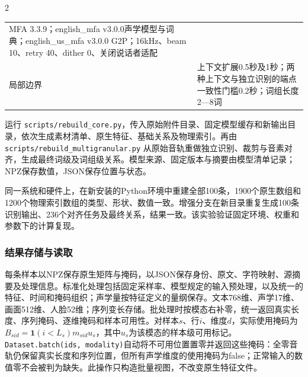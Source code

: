 \begin{PaperTable}{2}
\begin{table}[!htbp]
\begin{tabular}{@{}ll@{}}
\begin{minipage}[t]{\dimexpr 0.850000\linewidth-1.700000\tabcolsep\relax}
MFA 3.3.9；english\_mfa v3.0.0声学模型与词典；english\_us\_mfa v3.0.0 G2P；16kHz、beam 10、retry 40、dither 0、关闭说话者适配\strut
\end{minipage}\tabularnewline
\begin{minipage}[t]{\dimexpr 0.150000\linewidth-0.300000\tabcolsep\relax}\raggedright
局部边界\strut
\end{minipage} & \begin{minipage}[t]{\dimexpr 0.850000\linewidth-1.700000\tabcolsep\relax}\raggedright
上下文扩展0.5秒及1秒；两种上下文与独立识别的端点一致性门槛0.2秒；词组长度2---8词\strut
\end{minipage}\tabularnewline
\bottomrule
\end{tabular}
\end{table}

\end{PaperTable}

运行 \texttt{scripts/\allowbreak{}rebuild\_\allowbreak{}core.py}，传入原始附件目录、固定模型缓存和新输出目录，依次生成素材清单、原生特征、基础关系及物理索引。再由 \texttt{scripts/\allowbreak{}rebuild\_\allowbreak{}multigra\allowbreak{}nular.py} 从原始音轨重做独立识别、裁剪与音素对齐，生成最终词级及词组级关系。模型来源、固定版本与摘要由模型清单记录；NPZ保存数值，JSON保存位置与状态。

同一系统和硬件上，在新安装的Python环境中重建全部100条，1900个原生数组和1200个物理索引数组的类型、形状、数值一致。增强分支在新目录重复生成100条识别输出、236个对齐任务及最终关系，结果一致。该实验验证固定环境、权重和参数下的计算复现。

\hypertarget{q1-ux7ed3ux679cux5b58ux50a8ux4e0eux8bfbux53d6}{%
\subsubsection{结果存储与读取}\label{q1-ux7ed3ux679cux5b58ux50a8ux4e0eux8bfbux53d6}}

每条样本以NPZ保存原生矩阵与掩码，以JSON保存身份、原文、字符映射、源摘要及处理信息。标准化处理包括固定采样率、模型规定的输入预处理，以及统一的特征、时间和掩码组织；声学量按特征定义的量纲保存。文本768维、声学17维、画面512维、人脸52维；序列变长存储。批处理时按模态右补零，统一返回真实长度、序列掩码、逐维掩码和样本可用性。对样本\(s\)、行\(i\)、维度\(d\)，实际使用掩码为\(B_{sid}=\mathbf1(i<L_s)m_{sid}u_s\)，其中\(u_s\)为该模态的样本级可用标记。\texttt{Dataset.batch(ids, modality\allowbreak{})}自动将不可用位置置零并返回这些掩码：全零音轨仍保留真实长度和序列位置，但所有声学维度的使用掩码为false；正常输入的数值零不会被判为缺失。此操作只构造批量视图，不改变原生特征文件。

